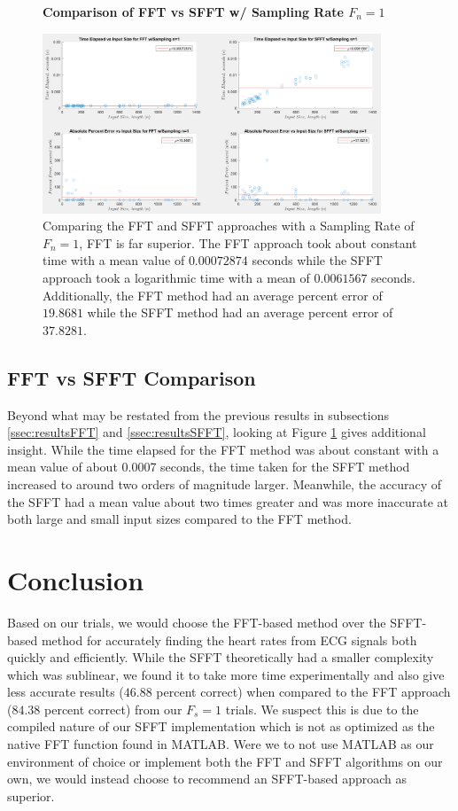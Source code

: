 \documentclass[twocolumn]{article}
\begin{document}
\begin{flushleft}
		 	\begin{figure}[h]
		 	\centering
		 	\textbf{Comparison of FFT vs SFFT w/ Sampling Rate $F_{n}=1$}\par\medskip
		 	\includegraphics[width=0.9\textwidth,keepaspectratio]{FFTvsSFFT_graph.png}
		 	\caption{Comparing the FFT and SFFT approaches with a Sampling Rate of $F_{n}=1$, FFT is far superior. The FFT approach took about constant time with a mean value of $0.00072874$ seconds while the SFFT approach took a logarithmic time with a mean of $0.0061567$ seconds. Additionally, the FFT method had an average percent error of $19.8681$ while the SFFT method had an average percent error of $37.8281$.}
		 \label{fig:compareFFTandSFFT}
	 \end{figure}
	 \hspace{2em}\subsection{FFT vs SFFT Comparison}
	 Beyond what may be restated from the previous results in subsections \ref{ssec:resultsFFT} and \ref{ssec:resultsSFFT}, looking at Figure \ref{fig:compareFFTandSFFT} gives additional insight. While the time elapsed for the FFT method was about constant with a mean value of about 0.0007 seconds, the time taken for the SFFT method increased to around two orders of magnitude larger. Meanwhile, the accuracy of the SFFT had a mean value about two times greater and was more inaccurate at both large and small input sizes compared to the FFT method. \\ \vspace{-1em}
	 \section{Conclusion}
	Based on our trials, we would choose the FFT-based method over the SFFT-based method for accurately finding the heart rates from ECG signals both quickly and efficiently. While the SFFT theoretically had a smaller complexity which was sublinear, we found it to take more time experimentally and also give less accurate results ($46.88$ percent correct) when compared to the FFT approach ($84.38$ percent correct) from our $F_{s}=1$ trials. We suspect this is due to the compiled nature of our SFFT implementation which is not as optimized as the native FFT function found in MATLAB. Were we to not use MATLAB as our environment of choice or implement both the FFT and SFFT algorithms on our own, we would instead choose to recommend an SFFT-based approach as superior.
	\printbibliography
	\end{flushleft}
	
\end{document}
